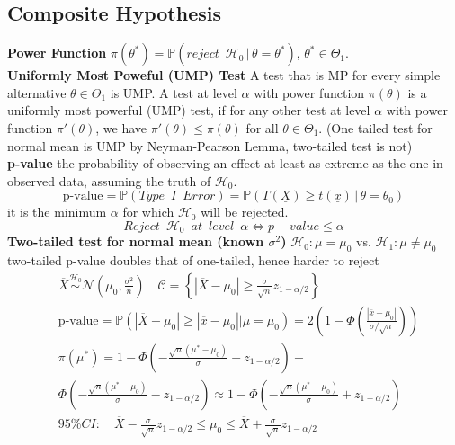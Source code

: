 \documentclass[8pt]{article}
\begin{document}
\begin{multicols}{3}
{   \subsection*{Composite Hypothesis}
   \textbf{Power Function} $\pi(\theta^*) = \mathbb{P}\left( reject\enspace \mathcal{H}_0 \,|\, \theta = \theta^* \right)$, $\theta^* \in\Theta_1$.\\
   \textbf{Uniformly Most Poweful (UMP) Test} A test that is MP for every simple alternative $\theta \in \Theta_1$ is UMP. A test at level $\alpha$ with power function $\pi(\theta)$ is a uniformly most powerful (UMP) test, if for any other test at level $\alpha$ with power function $\pi'(\theta)$, we have $\pi'(\theta) \leq \pi(\theta)$ for all $\theta \in \Theta_1$. (One tailed test for normal mean is UMP by Neyman-Pearson Lemma, two-tailed test is not)\\
   \textbf{p-value} the probability of observing an effect at least as extreme as the one in observed data, assuming the truth of $\mathcal{H}_0$.
   \[
     \text{p-value} = \mathbb{P}(Type\enspace I\enspace Error) = \mathbb{P}(T(\underline{X}) \geq t(\underline{x})\,|\, \theta = \theta_0)
   \]
   it is the minimum $\alpha$ for which $\mathcal{H}_0$ will be rejected.
   \[
     Reject\enspace \mathcal{H}_0 \enspace at\enspace level\enspace \alpha \iff p-value \leq \alpha
   \]
   \textbf{Two-tailed test for normal mean (known $\sigma^2$)} $\mathcal{H}_0: \mu = \mu_0$ vs. $\mathcal{H}_1: \mu\neq \mu_0$ two-tailed p-value doubles that of one-tailed, hence harder to reject
   \begin{align*}
     &\overline{X} \stackrel{\mathcal{H}_0}{\sim} \mathcal{N} (\mu_0, \frac{\sigma^2}{n}) \quad  \mathcal{C} = \left\{ | \overline{X} - \mu_0| \geq \frac{\sigma}{\sqrt{n}} z_{1 - \alpha / 2} \right\}\\
     &\text{p-value} = \mathbb{P}\left(|\overline{X} - \mu_0| \geq |\overline{x} - \mu_0| \biggr\rvert \mu = \mu_0\right) = 2(1 - \Phi(\frac{|\overline{x} - \mu_0|}{\sigma / \sqrt{n}}) )\\
     & \pi(\mu^*) = 1- \Phi(-\frac{\sqrt{n}(\mu^* - \mu_0)}{\sigma} + z_{1 - \alpha/2}) + \\ &\Phi(-\frac{\sqrt{n}(\mu^* - \mu_0)}{\sigma} - z_{1 - \alpha/2}) \approx 1- \Phi(-\frac{\sqrt{n}(\mu^* - \mu_0)}{\sigma} + z_{1 - \alpha/2}) \\
     & 95\% CI: \quad \overline{X} - \frac{\sigma}{\sqrt{n}}z_{1 - \alpha/2} \leq \mu_0 \leq \overline{X} + \frac{\sigma}{\sqrt{n}}z_{1 - \alpha/2}
   \end{align*}
}
\end{multicols}
\end{document}

